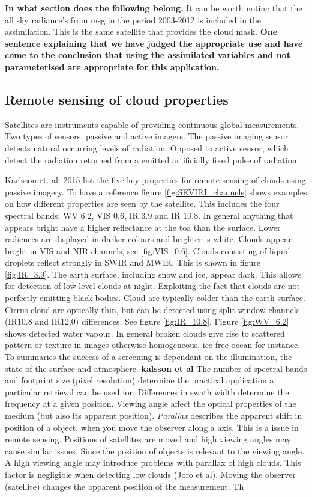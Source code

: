\textbf{In what section does the following belong.}
It can be worth noting that the all sky radiance's from \acrfull{msg} in the period 2003-2012 is included in the assimilation. This is the same satellite that provides the cloud mask. 
\textbf{One sentence explaining that we have judged the appropriate use and have come to the conclusion that using the assimilated variables and not parameterised are appropriate for this application.}

\subsection{Remote sensing of cloud properties}
Satellites are instruments capable of providing continuous global measurements. Two types of sensors, passive and active imagers. The passive imaging sensor detects natural occurring levels of radiation. Opposed to active sensor, which detect the radiation returned from a emitted artificially fixed pulse of radiation.

Karlsson et. al. 2015 list the five key properties for remote sensing of clouds using passive imagery. To have a reference figure \ref{fig:SEVIRI_channels} shows examples on how different properties are seen by the satellite. This includes the four spectral bands, WV 6.2, VIS 0.6, IR 3.9 and IR 10.8. In general anything that appears bright have a higher reflectance at the \acrfull{toa} than the surface. Lower radiences are displayed in darker colours and brighter is white. Clouds appear bright in VIS and NIR channels, see \ref{fig:VIS_0.6}. Clouds consisting of liquid droplets reflect strongly in SWIR and MWIR. This is shown in figure \ref{fig:IR_3.9}. The earth surface, including snow and ice, appear dark. This allows for detection of low level clouds at night. Exploiting the fact that clouds are not perfectly emitting black bodies. Cloud are typically colder than the earth surface. Cirrus cloud are optically thin, but can be detected using split window channels (IR10.8 and IR12.0) differences. See figure \ref{fig:IR_10.8}. Figure \ref{fig:WV_6.2} shows detected water vapour. In general broken clouds give rise to scattered pattern or texture in images otherwise homogeneous, ice-free ocean for instance. To summaries the success of a screening is dependant on the illumination, the state of the surface and atmosphere. \textbf{kalsson et al} The number of spectral bands and footprint size (pixel resolution) determine the practical application a particular retrieval can be used for. Differences in swath width determine the frequency at a given position. Viewing angle affect the optical properties of the medium (but also its apparent position). \textit{Parallax} describes the apparent shift in position of a object, when you move the observer along a axis. This is a issue in remote sensing. Positions of satellites are moved and high viewing angles may cause similar issues. Since the position of objects is relevant to the viewing angle. A high viewing angle may introduce problems with parallax of high clouds. This factor is negligible when detecting low clouds (Joro et al). Moving the observer (satellite) changes the apparent position of the measurement. Th

